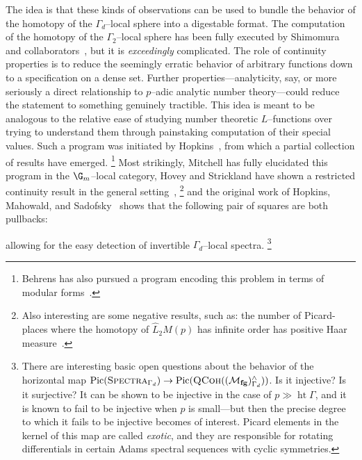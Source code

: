 The idea is that these kinds of observations can be used to bundle the behavior of the homotopy of the \(\Gamma_d\)--local sphere into a digestable format.
The computation of the homotopy of the \(\Gamma_2\)--local sphere has been fully executed by Shimomura and collaborators~\cite{Shimomura,ShimomuraYabeM20,ShimomuraYabeL2S,BehrensRevisited}, but it is \emph{exceedingly} complicated.
The role of continuity properties is to reduce the seemingly erratic behavior of arbitrary functions down to a specification on a dense set.
Further properties---analyticity, say, or more seriously a direct relationship to \(p\)--adic analytic number theory---could reduce the statement to something genuinely tractible.
This idea is meant to be analogous to the relative ease of studying number theoretic \(L\)--functions over trying to understand them through painstaking computation of their special values.
Such a program was initiated by Hopkins~\cite{StricklandpAdicInterpolation}, from which a partial collection of results have emerged.%
\footnote{%
Behrens has also pursued a program encoding this problem in terms of modular forms~\cite{BehrensCongruences,BehrensModularDescription,BehrensBuildings}.
}
Most strikingly, Mitchell \cite{MitchellIwasawa,HahnMitchell} has fully elucidated this program in the \(\G_m\)--local category, Hovey and Strickland have shown a restricted continuity result in the general setting~\cite[Section 14]{HoveyStrickland},%
\footnote{%
Also interesting are some negative results, such as: the number of Picard-places where the homotopy of \(\widehat L_2 M(p)\) has infinite order has positive Haar measure~\cite[Section 15.2]{HoveyStrickland}.
}
and the original work of Hopkins, Mahowald, and Sadofsky~\cite{HMS} shows that the following pair of squares are both pullbacks:
\begin{center}
\end{center}
allowing for the easy detection of invertible \(\Gamma_d\)--local spectra.%
\footnote{%
There are interesting basic open questions about the behavior of the horizontal map \(\operatorname{Pic}(\normalfont\textsc{Spectra}_{\Gamma_d}) \to \operatorname{Pic}(\normalfont\textsc{QCoh}((\mathcal{M}_{\mathbf{fg}})^\wedge_{\Gamma_d}))\).
Is it injective?
Is it surjective?
It can be shown to be injective in the case of \(p \gg \operatorname{ht} \Gamma\), and it is known to fail to be injective when \(p\) is small---but then the precise degree to which it fails to be injective becomes of interest.
Picard elements in the kernel of this map are called \textit{exotic}, and they are responsible for rotating differentials in certain Adams spectral sequences with cyclic symmetries.
}

